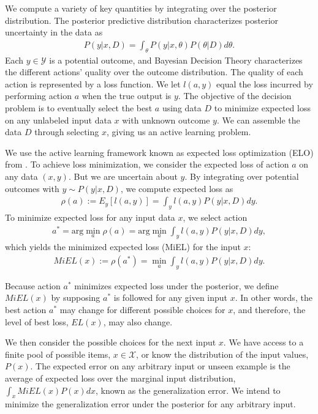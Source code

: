 \documentclass[nonblindrev]{informs3}
\begin{document}
We compute a variety of key quantities by integrating over the posterior distribution. The posterior predictive distribution characterizes posterior uncertainty in the data as
\begin{align} 
P(y|x,D) = \int_\theta P(y|x,\theta)P(\theta|D)d\theta .
\end{align}
Each $y \in \mathcal{Y}$ is a potential outcome, and Bayesian Decision Theory characterizes the different actions' quality over the outcome distribution. The quality of each action is represented by a loss function. We let $l(a,y)$ equal the loss incurred by performing action $a$ when the true output is $y$. The objective of the decision problem is to eventually select the best $a$ using data $D$ to minimize expected loss on any unlabeled input data $x$ with unknown outcome $y$. We can assemble the data $D$ through selecting $x$, giving us an active learning problem.

We use the active learning framework known as expected loss optimization (ELO) from \cite{long2010elo}. To achieve loss minimization, we consider the expected loss of action $a$ on any data  $(x,y)$. But we are uncertain about $y$. By integrating over potential outcomes with $y \sim P(y|x,D)$, we compute expected loss as
\begin{align}
\rho(a) := E_{y} \left[ l(a,y) \right] = \int_y l(a,y) P(y|x,D) dy .
\end{align}To minimize expected loss for any input data $x$, we select action
\begin{align}
a^{*} = \text{arg}\min_a \rho(a) = \text{arg}\min_a \int_y l(a,y) P(y|x,D) dy,
\end{align}which yields the minimized expected loss (MiEL) for the input $x$:
\begin{align}
MiEL(x) := \rho(a^{*}) = \min_a \int_y l(a,y) P(y|x,D) dy .
\end{align}

Because action $a^{*}$ minimizes expected loss under the posterior, we define $MiEL(x)$ by supposing $a^{*}$ is followed for any given input $x$. In other words, the best action $a^{*}$ may change for different possible choices for $x$, and therefore, the level of best loss, $EL(x)$, may also change. 

We then consider the possible choices for the next input $x$. We have access to a finite pool of possible items, $x \in \mathcal{X}$, or know the distribution of the input values, $P(x)$. The expected error on any arbitrary input or unseen example is the average of expected loss over the marginal input distribution, $\int_x MiEL(x)P(x)dx$, known as the generalization error. We intend to minimize the generalization error under the posterior for any arbitrary input.
\end{document}
